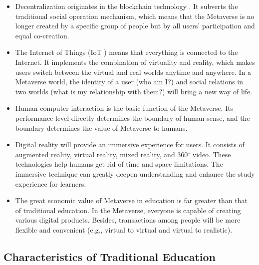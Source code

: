 \documentclass[conference]{IEEEtran}
\begin{document}
\begin{itemize}
    \item Decentralization originates in the blockchain technology \cite{sharples2016blockchain}. It subverts the traditional social operation mechanism, which means that the Metaverse is no longer created by a specific group of people but by all users' participation and equal co-creation.
    
    \item The Internet of Things (IoT \cite{mozumder2022overview}) means that everything is connected to the Internet. It implements the combination of virtuality and reality, which makes users switch between the virtual and real worlds anytime and anywhere. In a Metaverse world, the identity of a user (who am I?) and social relations in two worlds (what is my relationship with them?) will bring a new way of life.
    
    \item Human-computer interaction \cite{miller2020personal,zhan2020augmented} is the basic function of the Metaverse. Its performance level directly determines the boundary of human sense, and the boundary determines the value of Metaverse to humans.

    \item Digital reality \cite{jones2020characterising,siyaev2021towards} will provide an immersive experience for users. It consists of augmented reality, virtual reality, mixed reality, and 360$^\circ$ video. These technologies help humans get rid of time and space limitations. The immersive technique can greatly deepen understanding and enhance the study experience for learners.
    
    \item The great economic value of Metaverse in education is far greater than that of traditional education. In the Metaverse, everyone is capable of creating various digital products. Besides, transactions among people will be more flexible and convenient (e.g., virtual to virtual and virtual to realistic).
\end{itemize}


\subsection{Characteristics of Traditional Education}
\end{document}
